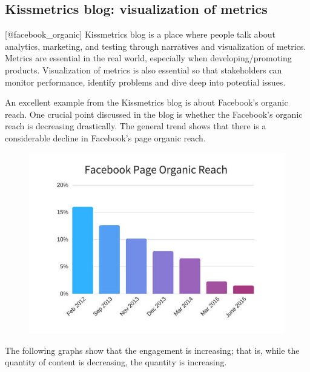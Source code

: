 \documentclass[]{book}
\theoremstyle{definition}
\theoremstyle{definition}
\theoremstyle{definition}
\theoremstyle{remark}
\begin{document}
\subsection{Kissmetrics blog: visualization of
metrics}\label{kissmetrics-blog-visualization-of-metrics}

{[}@facebook\_organic{]} Kissmetrics blog is a place where people talk
about analytics, marketing, and testing through narratives and
visualization of metrics. Metrics are essential in the real world,
especially when developing/promoting products. Visualization of metrics
is also essential so that stakeholders can monitor performance, identify
problems and dive deep into potential issues.

An excellent example from the Kissmetrics blog is about Facebook's
organic reach. One crucial point discussed in the blog is whether the
Facebook's organic reach is decreasing drastically. The general trend
shows that there is a considerable decline in Facebook's page organic
reach.

\begin{figure}
\centering
\includegraphics{images/facebook-page-organic-reach-decline-over-years.jpg}
\caption{}
\end{figure}

The following graphs show that the engagement is increasing; that is,
while the quantity of content is decreasing, the quantity is increasing.
\end{document}
